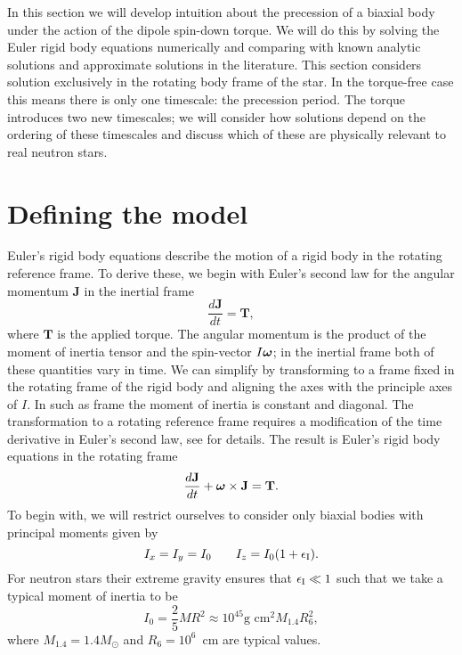 \documentclass[../full_thesis/full_thesis.tex]{subfiles}
\begin{document}
In this section we will develop intuition about the precession of a biaxial
body under the action of the \citet{Goldreich1970} dipole spin-down torque.  We
will do this by solving the Euler rigid body equations numerically and
comparing with known analytic solutions and approximate solutions in the
literature. This section considers solution exclusively in the rotating body frame
of the star. In the torque-free case this means there is only one timescale: the
precession period.  The torque introduces two new timescales; we will consider
how solutions depend on the ordering of these timescales and discuss which of
these are physically relevant to real neutron stars.

\section{Defining the model}
\label{sec: defining the model}

Euler's rigid body equations describe the motion of a rigid body in the rotating
reference frame. To derive these, we begin with Euler's second law for the
angular momentum $\mathbf{J}$ in the inertial frame
\begin{equation}
    \frac{d\mathbf{J}}{dt}=\mathbf{T},
\end{equation}
where $\mathbf{T}$ is the applied torque. The angular momentum is the product
of the moment of inertia tensor and the spin-vector $I \boldsymbol{\omega}$; in the inertial
frame both of these quantities vary in time. We can simplify by
transforming to a frame fixed in the rotating frame of the rigid body and
aligning the axes with the principle axes of $I$. In such as frame the moment
of inertia is constant and diagonal. The transformation to a rotating reference
frame requires a modification of the time derivative in Euler's second law, see
\citet{Landau1969} for details. The result is Euler's rigid body equations in
the rotating frame
\begin{equation}
    \frac{d\mathbf{J}}{dt} + \boldsymbol{\omega} \times \mathbf{J} = \mathbf{T}.
    \label{eqn: eom}
\end{equation}
To begin with, we will restrict ourselves to consider only biaxial bodies with
principal moments given by
\begin{equation}
I_{x} = I_{y} = I_{0} \;\;\;\;\;\;\; I_{z} = I_{0}(1+\epsilon_{\mathrm{I}}).
\end{equation}
For neutron stars their extreme gravity ensures that $\epsilon_{\mathrm{I}} \ll 1$ such that
we take a typical moment of inertia to be
\begin{equation}
I_{0} = \frac{2}{5}MR^{2} \approx 10^{45}\textrm{g cm}^{2} M_{1.4}R_6^{2},
\end{equation}
where $M_{1.4} = 1.4 M_{\odot}$ and $R_6=10^{6}$~cm are typical values.
\end{document}
